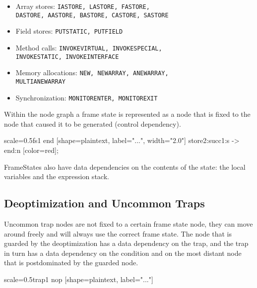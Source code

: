 \documentclass[twocolumn]{svjour3}
\begin{document}
\begin{itemize}
    \item Array stores: {\tt IASTORE, LASTORE, FASTORE, \\DASTORE, AASTORE, BASTORE, CASTORE, SASTORE}
    \item Field stores: {\tt PUTSTATIC, PUTFIELD}
    \item Method calls: {\tt INVOKEVIRTUAL, INVOKESPECIAL, \\INVOKESTATIC, INVOKEINTERFACE}
    \item Memory allocations: {\tt NEW, NEWARRAY, ANEWARRAY, \\MULTIANEWARRAY}
    \item Synchronization: {\tt MONITORENTER, MONITOREXIT}
\end{itemize}

Within the node graph a frame state is represented as a node that is fixed to the node that caused it to be generated (control dependency).

\begin{digraphenv}{scale=0.5}{fs1}
    end [shape=plaintext, label="...", width="2.0"]
    store2:succ1:s -> end:n [color=red];
\end{digraphenv}

FrameStates also have data dependencies on the contents of the state: the local variables and the expression stack.

\subsection{Deoptimization and Uncommon Traps}
Uncommon trap nodes are not fixed to a certain frame state node, they can move around freely and will always use the correct frame state.
The node that is guarded by the deoptimization has a data dependency on the trap, and the trap in turn has a data dependency on the condition and on the most distant node that is postdominated by the guarded node.

\begin{digraphenv}{scale=0.5}{trap1}
    nop [shape=plaintext, label="..."]
\end{digraphenv}
\end{document}
